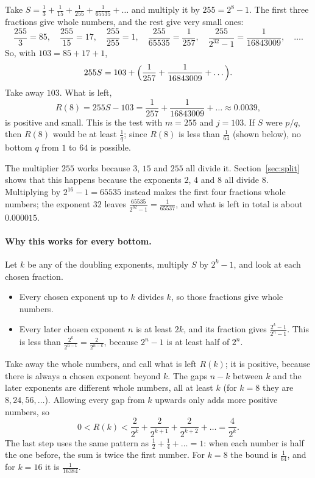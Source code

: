 \documentclass[10pt]{article}
\theoremstyle{plain}
\theoremstyle{definition}
\theoremstyle{remark}
\begin{document}
Take $S=\tfrac13+\tfrac1{15}+\tfrac1{255}+\tfrac1{65535}+\dots$ and multiply
it by $255=2^8-1$. The first three fractions give whole numbers, and the rest
give very small ones:
\[
 \frac{255}3=85,\quad \frac{255}{15}=17,\quad \frac{255}{255}=1,\quad
 \frac{255}{65535}=\frac1{257},\quad \frac{255}{2^{32}-1}=\frac1{16843009},\quad\dots .
\]
So, with $103=85+17+1$,
\[
 255S=103+\Bigl(\frac1{257}+\frac1{16843009}+\dots\Bigr).
\]
Take away $103$. What is left,
\[
 R(8)=255S-103=\frac1{257}+\frac1{16843009}+\dots\approx0.0039 ,
\]
is positive and small. This is the test with $m=255$ and $j=103$. If $S$
were $p/q$, then $R(8)$ would be at least $\tfrac1q$; since $R(8)$ is less
than $\tfrac1{64}$ (shown below), no bottom $q$ from $1$ to $64$ is possible.

The multiplier $255$ works because $3$, $15$ and $255$ all divide it.
Section~\ref{sec:split} shows that this happens because the exponents $2$,
$4$ and $8$ all divide $8$. Multiplying by $2^{16}-1=65535$
instead makes the first four fractions whole numbers; the exponent $32$ leaves
$\tfrac{65535}{2^{32}-1}=\tfrac1{65537}$, and what is left in total is about
$0.000015$.

\paragraph{Why this works for every bottom.} Let $k$ be any of the doubling
exponents, multiply $S$ by $2^k-1$, and look at each chosen fraction.
\begin{itemize}
\item Every chosen exponent up to $k$ divides $k$, so those fractions give
 whole numbers.
\item Every later chosen exponent $n$ is at least $2k$, and its fraction gives
 $\frac{2^k-1}{2^n-1}$. This is less than $\frac{2^k}{2^{n-1}}=\frac2{2^{n-k}}$,
 because $2^n-1$ is at least half of $2^n$.
\end{itemize}
Take away the whole numbers, and call what is left $R(k)$; it is positive,
because there is always a chosen exponent beyond $k$. The gaps $n-k$ between
$k$ and the later exponents are different whole numbers, all at least $k$
(for $k=8$ they are $8,24,56,\dots$). Allowing every gap from $k$ upwards only
adds more positive numbers, so
\[
 0<R(k)<\frac2{2^k}+\frac2{2^{k+1}}+\frac2{2^{k+2}}+\dots=\frac4{2^k}.
\]
The last step uses the same pattern as $\tfrac12+\tfrac14+\dots=1$: when each
number is half the one before, the sum is twice the first number. For $k=8$
the bound is $\tfrac1{64}$, and for $k=16$ it is $\tfrac1{16384}$.
\end{document}
